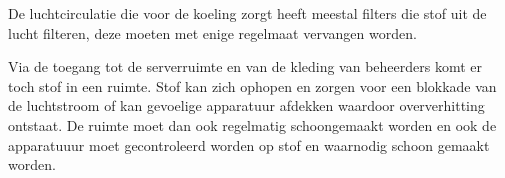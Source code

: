 De luchtcirculatie die voor de koeling zorgt heeft meestal filters die stof uit de lucht filteren, deze moeten met enige regelmaat vervangen worden.

Via de toegang tot de serverruimte en van de kleding van beheerders komt er toch stof in een ruimte. Stof kan zich ophopen en zorgen voor een blokkade van de luchtstroom of kan gevoelige apparatuur afdekken waardoor oververhitting ontstaat. De ruimte moet dan ook regelmatig schoongemaakt worden en ook de apparatuuur moet gecontroleerd worden op stof en waarnodig schoon gemaakt worden.
